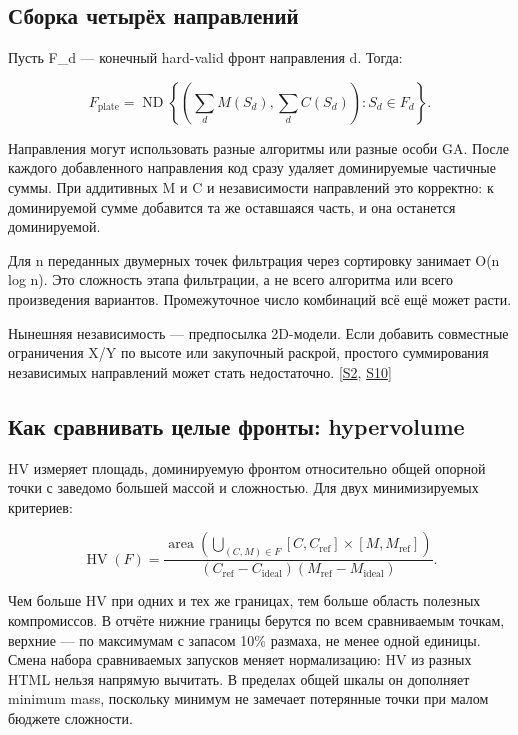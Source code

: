 \documentclass[11pt,a4paper]{article}
\begin{document}
\subsection{Сборка четырёх направлений}

Пусть F\_d — конечный hard-valid фронт направления d. Тогда:


\[
F_{\mathrm{plate}}=\operatorname{ND}\!\left\{
\left(\sum_d M(S_d),\sum_d C(S_d)\right):S_d\in F_d
\right\}.
\]

Направления могут использовать разные алгоритмы или разные особи GA. После каждого добавленного направления код сразу удаляет доминируемые частичные суммы. При аддитивных M и C и независимости направлений это корректно: к доминируемой сумме добавится та же оставшаяся часть, и она останется доминируемой.


Для n переданных двумерных точек фильтрация через сортировку занимает O(n log n). Это сложность этапа фильтрации, а не всего алгоритма или всего произведения вариантов. Промежуточное число комбинаций всё ещё может расти.


Нынешняя независимость — предпосылка 2D-модели. Если добавить совместные ограничения X/Y по высоте или закупочный раскрой, простого суммирования независимых направлений может стать недостаточно. {\color{Teal}\small[\hyperlink{S2}{S2}, \hyperlink{S10}{S10}]}


\subsection{Как сравнивать целые фронты: hypervolume}

HV измеряет площадь, доминируемую фронтом относительно общей опорной точки с заведомо большей массой и сложностью. Для двух минимизируемых критериев:


\[
\operatorname{HV}(F)=
\frac{\operatorname{area}\!\left(
\displaystyle\bigcup_{(C,M)\in F}[C,C_{\mathrm{ref}}]\times[M,M_{\mathrm{ref}}]
\right)}{(C_{\mathrm{ref}}-C_{\mathrm{ideal}})(M_{\mathrm{ref}}-M_{\mathrm{ideal}})}.
\]

Чем больше HV при одних и тех же границах, тем больше область полезных компромиссов. В отчёте нижние границы берутся по всем сравниваемым точкам, верхние — по максимумам с запасом 10\% размаха, не менее одной единицы. Смена набора сравниваемых запусков меняет нормализацию: HV из разных HTML нельзя напрямую вычитать. В пределах общей шкалы он дополняет minimum mass, поскольку минимум не замечает потерянные точки при малом бюджете сложности.
\end{document}
